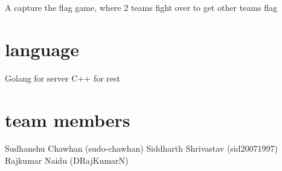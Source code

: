 A capture the flag game, where 2 teams fight over to get other teams flag

\section*{language}

Golang for server C++ for rest

\section*{team members}

Sudhanshu Chawhan (sudo-\/chawhan) Siddharth Shrivastav (sid20071997) Rajkumar Naidu (D\+Raj\+KumarN) 